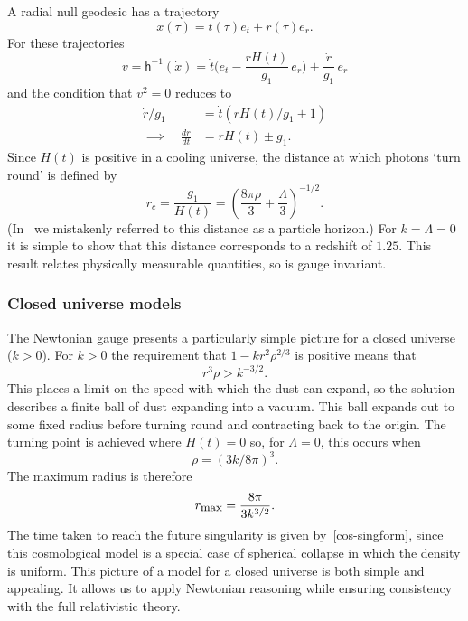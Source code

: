 \documentclass[a4paper]{article}
\numberwithin{equation}{section}
\newcommand{\rdot}{\dot{r}}
\newcommand{\tdot}{\dot{t}}
\newcommand{\xdot}{\dot{x}}
\newcommand{\lih}{\mathsf{h}}
\newcommand{\hu}{\lih}
\begin{document}
A radial null geodesic has a trajectory
%
\begin{equation}
x(\tau) = t(\tau) e_t + r(\tau) e_r.
\end{equation}
%
For these trajectories
%
\begin{equation}
v = \hu^{-1}(\xdot) = \tdot \bigl( e_t - \frac{r H(t)}{g_1} \, e_r
\bigr) + \frac{\rdot}{g_1} \, e_r
\end{equation}
%
and the condition that $v^2=0$ reduces to
%
\begin{align}
\rdot /g_1 &= \tdot (r H(t) /g_1 \pm 1) \\
\implies \quad \frac{dr}{dt} &= r H(t) \pm g_1. 
\end{align}
%
Since $H(t)$ is positive in a cooling universe, the distance at which
photons `turn round' is defined by
%
\begin{equation}
r_c = \frac{g_1}{H(t)} = \left( \frac{8 \pi \rho}{3} + \frac{\Lambda}{3}
\right)^{-1/2}.
\end{equation} 
%
(In~\cite{DGL-erice} we mistakenly referred to this distance as a
particle horizon.)  For $k=\Lambda=0$ it is simple to show that this
distance corresponds to a redshift of $1.25$.  This result relates
physically measurable quantities, so is gauge invariant.


\subsubsection*{Closed universe models}

The Newtonian gauge presents a particularly simple picture for a
closed universe ($k>0$).  For $k>0$ the requirement that
$1-kr^2\rho^{2/3}$ is positive means that
%
\begin{equation}
r^3 \rho > k^{-3/2}.
\end{equation} 
%
This places a limit on the speed with which the dust can expand, so
the solution describes a finite ball of dust expanding into a vacuum.
This ball expands out to some fixed radius before turning round and
contracting back to the origin.  The turning point is achieved where $
H(t) = 0$ so, for $\Lambda=0$, this occurs when
%
\begin{equation}
\rho = (3k/8\pi)^3.
\end{equation}
%
The maximum radius is therefore
%
\begin{equation}
r_{\mbox{\small max}} = \frac{8\pi}{3k^{3/2}}.
\end{equation} 
%
The time taken to reach the future singularity is given
by~\eqref{cos-singform}, since this cosmological model is a special case
of spherical collapse in which the density is uniform.  This picture
of a model for a closed universe is both simple and appealing.  It
allows us to apply Newtonian reasoning while ensuring consistency
with the full relativistic theory.
\end{document}
